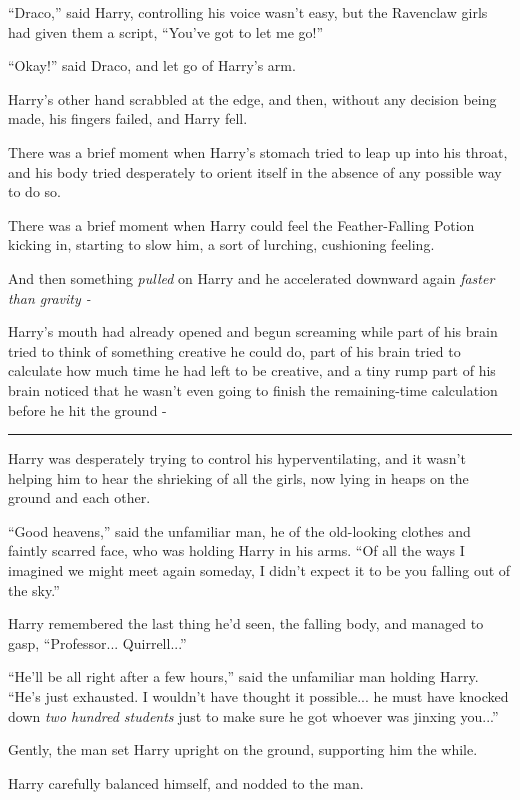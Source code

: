 ``Draco,'' said Harry, controlling his voice wasn't easy, but the Ravenclaw girls had given them a script, ``You've got to let me go!''

``Okay!'' said Draco, and let go of Harry's arm.

Harry's other hand scrabbled at the edge, and then, without any decision being made, his fingers failed, and Harry fell.

There was a brief moment when Harry's stomach tried to leap up into his throat, and his body tried desperately to orient itself in the absence of any possible way to do so.

There was a brief moment when Harry could feel the Feather-Falling Potion kicking in, starting to slow him, a sort of lurching, cushioning feeling.

And then something \emph{pulled} on Harry and he accelerated downward again \emph{faster than gravity -}

Harry's mouth had already opened and begun screaming while part of his brain tried to think of something creative he could do, part of his brain tried to calculate how much time he had left to be creative, and a tiny rump part of his brain noticed that he wasn't even going to finish the remaining-time calculation before he hit the ground -

\begin{center}\rule{3in}{0.4pt}\end{center}

Harry was desperately trying to control his hyperventilating, and it wasn't helping him to hear the shrieking of all the girls, now lying in heaps on the ground and each other.

``Good heavens,'' said the unfamiliar man, he of the old-looking clothes and faintly scarred face, who was holding Harry in his arms. ``Of all the ways I imagined we might meet again someday, I didn't expect it to be you falling out of the sky.''

Harry remembered the last thing he'd seen, the falling body, and managed to gasp, ``Professor... Quirrell...''

``He'll be all right after a few hours,'' said the unfamiliar man holding Harry. ``He's just exhausted. I wouldn't have thought it possible... he must have knocked down \emph{two hundred students} just to make sure he got whoever was jinxing you...''

Gently, the man set Harry upright on the ground, supporting him the while.

Harry carefully balanced himself, and nodded to the man.

